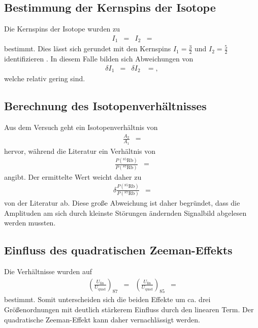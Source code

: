 \subsection{Bestimmung der Kernspins der Isotope}
Die Kernspins der Isotope wurden zu
\begin{align*}
  I_1 &=  & I_2 &= 
\end{align*}
bestimmt.
Dies lässt sich gerundet mit den Kernspins $I_1 = \frac{3}{2}$ und $I_2 = \frac{5}{2}$ identifizieren \cite{iaea}.
In diesem Falle bilden sich Abweichungen von
\begin{align*}
  \delta I_1 &=  & \delta I_2 &= ,
\end{align*}
welche relativ gering sind.

\subsection{Berechnung des Isotopenverhältnisses}
Aus dem Versuch geht ein Isotopenverhältnis von
\begin{align*}
  \frac{A_2}{A_1} &= 
\end{align*}
hervor, während die Literatur ein Verhältnis von
\begin{align*}
  \frac{P\left(^{85}\text{Rb}\right)}{P\left(^{87}\text{Rb}\right)} &= 
\end{align*}
angibt.
Der ermittelte Wert weicht daher zu
\begin{align*}
  \delta \frac{P\left(^{85}\text{Rb}\right)}{P\left(^{87}\text{Rb}\right)} &= 
\end{align*}
von der Literatur ab.
Diese große Abweichung ist daher begründet, dass die Amplituden am sich durch kleinste Störungen ändernden Signalbild abgelesen werden mussten.

\subsection{Einfluss des quadratischen Zeeman-Effekts}

Die Verhältnisse wurden auf
\begin{align*}
  \left(\frac{U_\text{lin}}{U_\text{quad}}\right)_{87} &=  & \left(\frac{U_\text{lin}}{U_\text{quad}}\right)_{85} &= 
\end{align*}
bestimmt.
Somit unterscheiden sich die beiden Effekte um ca. drei Größenordnungen mit deutlich stärkerem Einfluss durch den linearen Term.
Der quadratische Zeeman-Effekt kann daher vernachlässigt werden.
